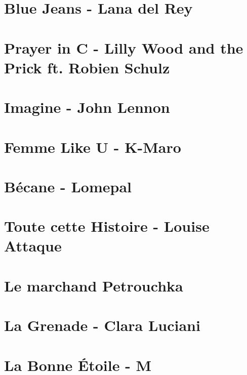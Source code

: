 \documentclass[11pt]{article}
\begin{document}
\section{Blue Jeans - Lana del Rey}


\section{Prayer in C - Lilly Wood and the Prick ft. Robien Schulz}



\section{Imagine - John Lennon}


\section{Femme Like U - K-Maro}


\section{Bécane - Lomepal}


\section{Toute cette Histoire - Louise Attaque}


\section{Le marchand Petrouchka}
\begin{guitar}

\end{guitar}

\section{La Grenade - Clara Luciani}
\begin{guitar}

\end{guitar}

\section{La Bonne Étoile - M}
\begin{guitar}

\end{guitar}
\end{document}
